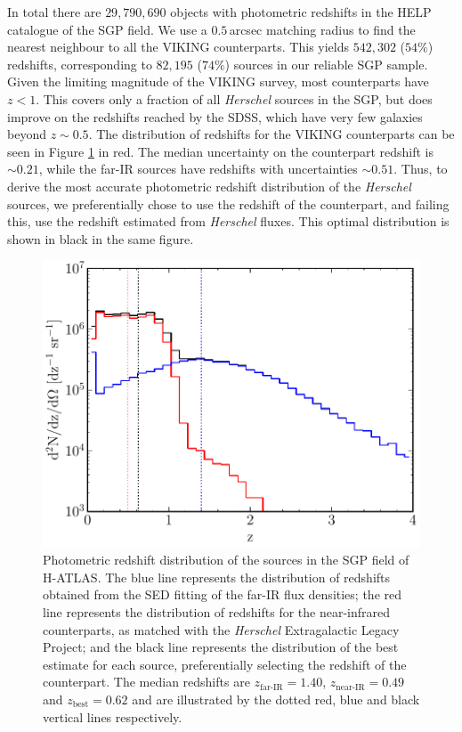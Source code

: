 In total there are $29,790,690$ objects with photometric redshifts in the HELP catalogue of the SGP field. We use a $0.5\,$arcsec matching radius to find the nearest neighbour to all the VIKING counterparts. This yields $542,302$ ($54\%$) redshifts, corresponding to $82,195$ ($74\%$) sources in our reliable SGP sample. Given the limiting magnitude of the VIKING survey, most counterparts have $z < 1$. This covers only a fraction of all \textit{Herschel} sources in the SGP, but does improve on the redshifts reached by the SDSS, which have very few galaxies beyond $z \sim 0.5$. The distribution of redshifts for the VIKING counterparts can be seen in Figure \ref{fig:redshift_distribution} in red. The median uncertainty on the counterpart redshift is $\sim 0.21$, while the far-IR sources have redshifts with uncertainties $\sim 0.51$. Thus, to derive the most accurate photometric redshift distribution of the \textit{Herschel} sources, we preferentially chose to use the redshift of the counterpart, and failing this, use the redshift estimated from \textit{Herschel} fluxes. This optimal distribution is shown in black in the same figure.

\begin{figure}
    \centering
    \includegraphics[width=0.77\columnwidth]{Figures/Figure_2_8.pdf}
    \caption[Photometric redshift distribution of SGP sources]{Photometric redshift distribution of the sources in the SGP field of H-ATLAS. The blue line represents the distribution of redshifts obtained from the SED fitting of the far-IR flux densities; the red line represents the distribution of redshifts for the near-infrared counterparts, as matched with the \textit{Herschel} Extragalactic Legacy Project; and the black line represents the distribution of the best estimate for each source, preferentially selecting the redshift of the counterpart. The median redshifts are $z_{\textrm{far-IR}} = 1.40$, $z_{\textrm{near-IR}} = 0.49$ and $z_{\textrm{best}} = 0.62$ and are illustrated by the dotted red, blue and black vertical lines respectively.}
    \label{fig:redshift_distribution}
\end{figure}

